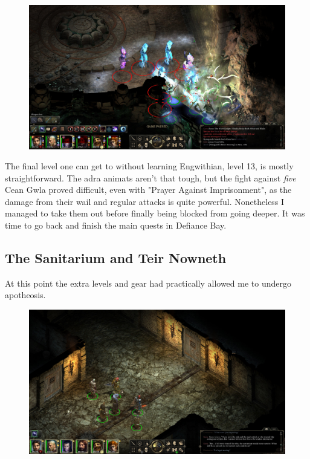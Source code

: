 \documentclass{article}
\begin{document}
\begin{figure}
\includegraphics[scale=0.33]{files/blog/2018_11_25_pillars_of_eternity_path_of_the_damned_act_ii/2018_11_25_paths_l13.jpg}
\end{figure}

The final level one can get to without learning Engwithian, level 13, is mostly straightforward.  The adra animats aren't that tough, but the fight against \emph{five} Cean Gwla proved difficult, even with "Prayer Against Imprisonment", as the damage from their wail and regular attacks is quite powerful.  Nonetheless I managed to take them out before finally being blocked from going deeper.  It was time to go back and finish the main quests in Defiance Bay.

\subsection{The Sanitarium and Teir Nowneth}
At this point the extra levels and gear had practically allowed me to undergo apotheosis.

\begin{figure}
\includegraphics[scale=0.33]{files/blog/2018_11_25_pillars_of_eternity_path_of_the_damned_act_ii/2018_11_25_sanitarium.jpg}
\end{figure}
\end{document}

